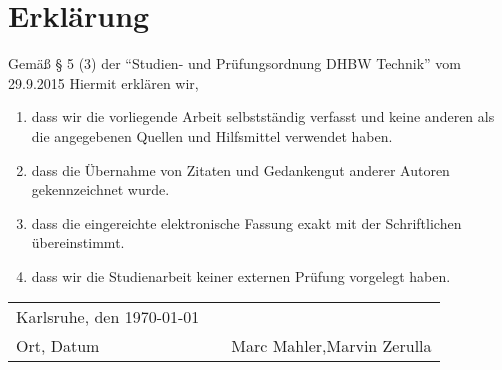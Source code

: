 \obeylines
{}
\section*{Erklärung}\vspace*{2em}
Gemäß § 5 (3) der \enquote{Studien- und Prüfungsordnung DHBW Technik} vom 29.9.2015
Hiermit erklären wir,
\begin{enumerate}
	\item{ dass wir die vorliegende Arbeit selbstständig verfasst und keine anderen als die angegebenen Quellen und Hilfsmittel verwendet haben. }
	\item{ dass die Übernahme von Zitaten und Gedankengut anderer Autoren gekennzeichnet wurde. }
	\item{ dass die eingereichte elektronische Fassung exakt mit der Schriftlichen übereinstimmt. }
	\item{ dass wir die Studienarbeit keiner externen Prüfung vorgelegt haben. }
\end{enumerate}\vspace{3em}

\begin{tabular}{lp{2em}l}
	Karlsruhe, den \today  && \hspace{7cm} \\\cline{1-1}\cline{3-3}
	Ort, Datum     &&  Marc Mahler,\hfill Marvin Zerulla
\end{tabular}
\newpage
